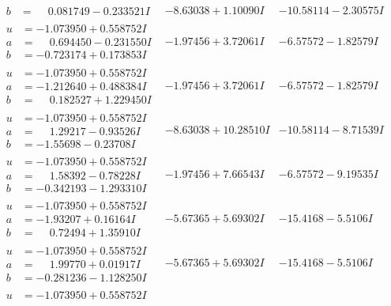 \documentclass[1p]{elsarticle_modified}
\theoremstyle{definition}
\begin{document}
$$\begin{array}{c|c|c}
\begin{aligned}
b &= \phantom{-}0.081749 - 0.233521 I\end{aligned}
 & -8.63038 + 1.10090 I & -10.58114 - 2.30575 I \\ \hline\begin{aligned}
u &= -1.073950 + 0.558752 I \\
a &= \phantom{-}0.694450 - 0.231550 I \\
b &= -0.723174 + 0.173853 I\end{aligned}
 & -1.97456 + 3.72061 I & -6.57572 - 1.82579 I \\ \hline\begin{aligned}
u &= -1.073950 + 0.558752 I \\
a &= -1.212640 + 0.488384 I \\
b &= \phantom{-}0.182527 + 1.229450 I\end{aligned}
 & -1.97456 + 3.72061 I & -6.57572 - 1.82579 I \\ \hline\begin{aligned}
u &= -1.073950 + 0.558752 I \\
a &= \phantom{-}1.29217 - 0.93526 I \\
b &= -1.55698 - 0.23708 I\end{aligned}
 & -8.63038 + 10.28510 I & -10.58114 - 8.71539 I \\ \hline\begin{aligned}
u &= -1.073950 + 0.558752 I \\
a &= \phantom{-}1.58392 - 0.78228 I \\
b &= -0.342193 - 1.293310 I\end{aligned}
 & -1.97456 + 7.66543 I & -6.57572 - 9.19535 I \\ \hline\begin{aligned}
u &= -1.073950 + 0.558752 I \\
a &= -1.93207 + 0.16164 I \\
b &= \phantom{-}0.72494 + 1.35910 I\end{aligned}
 & -5.67365 + 5.69302 I & -15.4168 - 5.5106 I \\ \hline\begin{aligned}
u &= -1.073950 + 0.558752 I \\
a &= \phantom{-}1.99770 + 0.01917 I \\
b &= -0.281236 - 1.128250 I\end{aligned}
 & -5.67365 + 5.69302 I & -15.4168 - 5.5106 I \\ \hline\begin{aligned}
u &= -1.073950 + 0.558752 I \\

\end{aligned}
\end{array}$$
\end{document}
